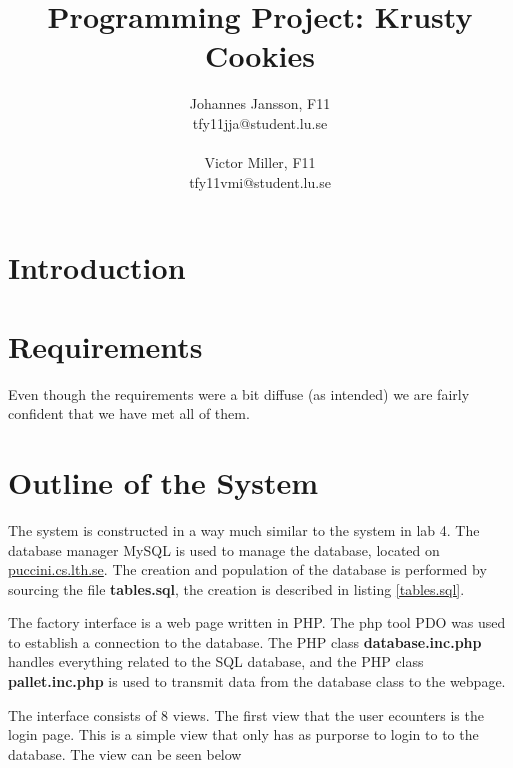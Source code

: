 \documentclass[a4paper]{scrartcl}
\numberwithin{equation}{section}
\begin{document}
\title{Programming Project: Krusty Cookies}
\author{Johannes Jansson, F11\\tfy11jja@student.lu.se\\\\Victor Miller, F11\\tfy11vmi@student.lu.se}

\date{}
\maketitle
\newpage

\section*{Introduction}
\section*{Requirements}
Even though the requirements were a bit diffuse (as intended) we are fairly confident that we have met all of them. 
\section*{Outline of the System}
The system is constructed in a way much similar to the system in lab 4. 
The database manager MySQL is used to manage the database, located on \url{puccini.cs.lth.se}. 
The creation and population of the database is performed by sourcing the file \textbf{tables.sql}, the creation is described in listing \ref{tables.sql}.

The factory interface is a web page written in PHP. 
The php tool PDO was used to establish a connection to the database. 
The PHP class \textbf{database.inc.php} handles everything related to the SQL database, and the PHP class \textbf{pallet.inc.php} is used to transmit data from the database class to the webpage.



The interface consists of 8 views. The first view that the user ecounters is the login page. This is a simple view that only has as purporse to login to to the database. The view can be seen below 
\end{document}
